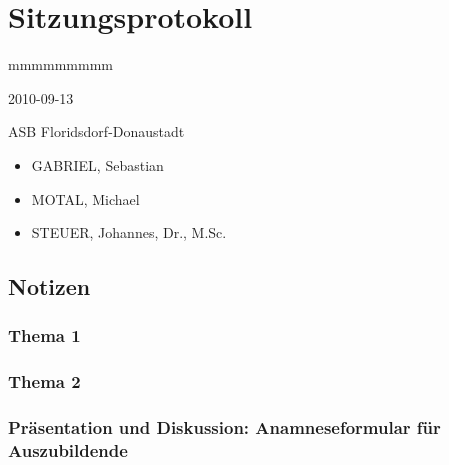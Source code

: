 \documentclass[
ngerman,
paper=a4,
fontsize=8pt,
headings=small,
draft=no,
parskip=half,
noonelinecaption
]{scrreprt}
\begin{document}
\section{Sitzungsprotokoll}

\begin{labeling}[:]{mmmmmmmmm}
  \item[Datum] 2010-09-13
  \item[Ort] ASB Floridsdorf-Donaustadt
  \item[Teilnehmer] \begin{itemize}
  \item GABRIEL, Sebastian
  \item MOTAL, Michael
  \item STEUER, Johannes, Dr., M.Sc.
\end{itemize}
\end{labeling}

% 

\subsection{Notizen}

\subsubsection{Thema 1}

\subsubsection{Thema 2}

\subsubsection{Präsentation und Diskussion: Anamneseformular
für Auszubildende}
\end{document}
